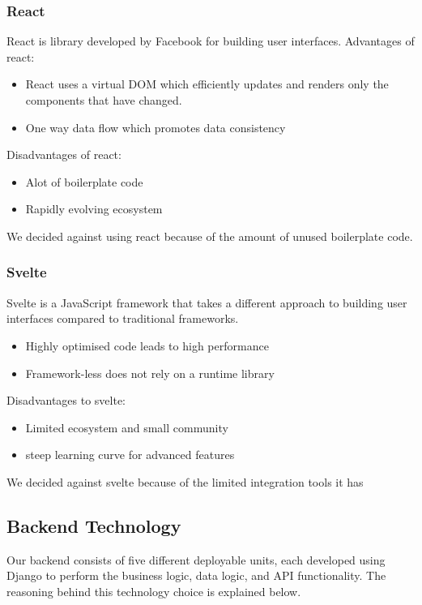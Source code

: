 \documentclass[12pt]{article}
\begin{document}
\subsubsection{React}
React is library developed by Facebook for building user interfaces.
Advantages of react:
\begin{itemize}
    \item React uses a virtual DOM which efficiently updates and renders only the components that have changed.
    \item One way data flow which promotes data consistency
\end{itemize}
Disadvantages of react:
\begin{itemize}
    \item Alot of boilerplate code
    \item Rapidly evolving ecosystem
\end{itemize}
We decided against using react because of the amount of unused boilerplate code.

\subsubsection{Svelte}
Svelte is a JavaScript framework that takes a different approach to building user interfaces compared to traditional frameworks.
\begin{itemize}
    \item Highly optimised code leads to high performance
    \item Framework-less does not rely on a runtime library
\end{itemize}
Disadvantages to svelte:
\begin{itemize}
    \item Limited ecosystem and small community
    \item steep learning curve for advanced features
\end{itemize}
We decided against svelte because of the limited integration tools it has

\subsection{Backend Technology}

Our backend consists of five different deployable units, each developed using Django to perform the business logic, data logic, and API functionality. The reasoning behind this technology choice is explained below.
\end{document}
